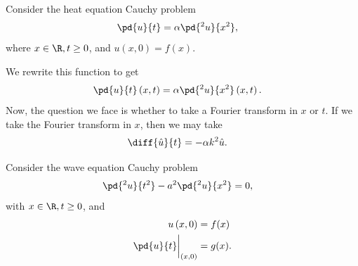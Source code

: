 \documentclass[10pt]{mypackage}
\begin{document}
\begin{example}
  Consider the heat equation Cauchy problem
  \begin{align*}
    \pd{u}{t} &= \alpha \pd{^2u}{x^2},
  \end{align*}
  where $x\in\R,t\geq 0$, and $u\left(x,0\right) = f(x)$.\newline

  We rewrite this function to get
  \begin{align*}
    \pd{u}{t}\left( x,t \right) &= \alpha \pd{^2u}{x^2}\left( x,t \right).
  \end{align*}
  Now, the question we face is whether to take a Fourier transform in $x$ or $t$. If we take the Fourier transform in $x$, then we may take
  \begin{align*}
    \diff{\hat{u}}{t} &= -\alpha k^2 \hat{u}.
  \end{align*}
  
\end{example}
\begin{example}
  Consider the wave equation Cauchy problem
  \begin{align*}
    \pd{^2u}{t^2} - a^2\pd{^2u}{x^2} &= 0,
  \end{align*}
  with $x\in\R,t\geq 0$, and
  \begin{align*}
    u\left( x,0 \right) &= f(x)\\
    \pd{u}{t}\biggr\vert_{(x,0)} &= g(x).
  \end{align*}
\end{example}
\end{document}

